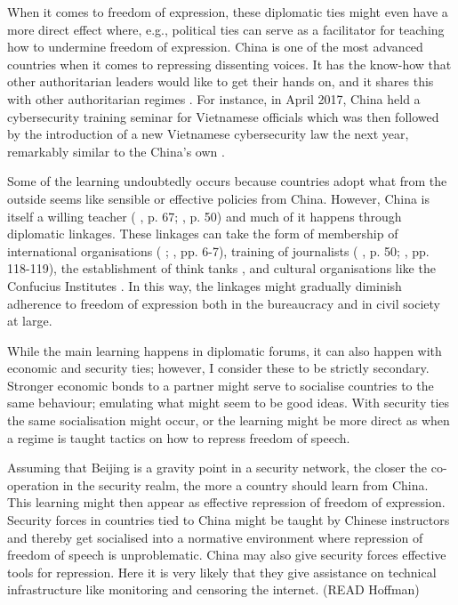 When it comes to freedom of expression, these diplomatic ties might even have a more direct effect where, e.g., political ties can serve as a facilitator for teaching how to undermine freedom of expression. China is one of the most advanced countries when it comes to repressing dissenting voices. It has the know-how that other authoritarian leaders would like to get their hands on, and it shares this with other authoritarian regimes \citep[pp. 3-6]{economy_exporting_2020}. For instance, in April 2017, China held a cybersecurity training seminar for Vietnamese officials which was then followed by the introduction of a new Vietnamese cybersecurity law the next year, remarkably similar to the China's own \citep[p. 8]{shahbaz_rise_2018}. 

Some of the learning undoubtedly occurs because countries adopt what from the outside seems like sensible or effective policies from China. However, China is itself a willing teacher (\citeauthor{brazys_chinas_2020} \citeyear{brazys_chinas_2020}, p. 67; \citeauthor{repucci_authoritarians_2022} \citeyear{repucci_authoritarians_2022}, p. 50) and much of it happens through diplomatic linkages. These linkages can take the form of membership of international organisations (\citeauthor{ambrosio_catching_2008} \citeyear{ambrosio_catching_2008}; \citeauthor{economy_exporting_2020} \citeyear{economy_exporting_2020}, pp. 6-7), training of journalists (\citeauthor{brazys_chinas_2020} \citeyear{brazys_chinas_2020}, p. 50; \citeauthor{cook_countering_2022} \citeyear{cook_countering_2022}, pp. 118-119), the establishment of think tanks \citep[pp. 15-16]{loughlin_chinese_2021}, and cultural organisations like the Confucius Institutes \citep{popovic_charm_2020}. In this way, the linkages might gradually diminish adherence to freedom of expression both in the bureaucracy and in civil society at large. 

While the main learning happens in diplomatic forums, it can also happen with economic and security ties; however, I consider these to be strictly secondary. Stronger economic bonds to a partner might serve to socialise countries to the same behaviour; emulating what might seem to be good ideas. With security ties the same socialisation might occur, or the learning might be more direct as when a regime is taught tactics on how to repress freedom of speech. 

Assuming that Beijing is a gravity point in a security network, the closer the co-operation in the security realm, the more a country should learn from China. This learning might then appear as effective repression of freedom of expression. Security forces in countries tied to China might be taught by Chinese instructors and thereby get socialised into a normative environment where repression of freedom of speech is unproblematic. China may also give security forces effective tools for repression. Here it is very likely that they give assistance on technical infrastructure like monitoring and censoring the internet. (READ Hoffman) 

